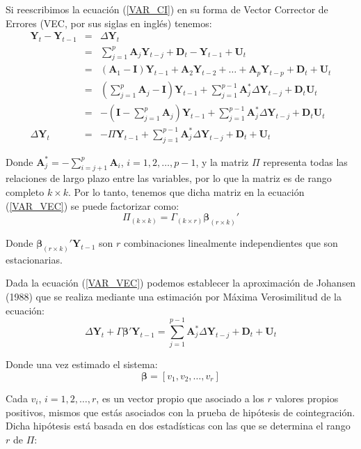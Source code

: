 \documentclass[
  a4paper,
]{article}
\begin{document}
Si reescribimos la ecuación (\ref{VAR_CI}) en su forma de Vector
Corrector de Errores (VEC, por sus siglas en inglés) tenemos:
\begin{eqnarray}
    \mathbf{Y}_t - \mathbf{Y}_{t-1} & = & \Delta \mathbf{Y}_t \nonumber \\
    & = & \sum_{j=1}^p \mathbf{A}_j \mathbf{Y}_{t-j} + \mathbf{D}_t - \mathbf{Y}_{t-1} + \mathbf{U}_t \nonumber \\
    & = & (\mathbf{A}_1 - \mathbf{I}) \mathbf{Y}_{t-1} + \mathbf{A}_2 \mathbf{Y}_{t-2} + \ldots + \mathbf{A}_p \mathbf{Y}_{t-p} + \mathbf{D}_t + \mathbf{U}_t \nonumber \\
    & = & \left( \sum_{j=1}^{p} \mathbf{A}_j - \mathbf{I} \right) \mathbf{Y}_{t-1} + \sum_{j=1}^{p-1} \mathbf{A}^*_j \Delta \mathbf{Y}_{t-j} + \mathbf{D}_t \mathbf{U}_t \nonumber \\
    & = & - \left( \mathbf{I} - \sum_{j=1}^{p} \mathbf{A}_j \right) \mathbf{Y}_{t-1} + \sum_{j=1}^{p-1} \mathbf{A}^*_j \Delta \mathbf{Y}_{t-j} + \mathbf{D}_t \mathbf{U}_t \nonumber \\
    \Delta \mathbf{Y}_t & = & - \Pi \mathbf{Y}_{t-1} + \sum_{j=1}^{p-1} \mathbf{A}^*_j \Delta \mathbf{Y}_{t-j} + \mathbf{D}_t + \mathbf{U}_t
    \label{VAR_VEC}
\end{eqnarray}

Donde \(\mathbf{A}_j^* = - \sum_{i=j+1}^p \mathbf{A}_i\),
\(i = 1, 2, \ldots, p-1\), y la matriz \(\Pi\) representa todas las
relaciones de largo plazo entre las variables, por lo que la matriz es
de rango completo \(k \times k\). Por lo tanto, tenemos que dicha matriz
en la ecuación (\ref{VAR_VEC}) se puede factorizar como: \[
    \Pi_{(k \times k)} = \Gamma_{(k \times r)} \boldsymbol{\beta}_{(r \times k)}'
    \label{Pi_Matrix}
\]

Donde \(\boldsymbol{\beta}_{(r \times k)}' \mathbf{Y}_{t-1}\) son \(r\)
combinaciones linealmente independientes que son estacionarias.

Dada la ecuación (\ref{VAR_VEC}) podemos establecer la aproximación de
Johansen (1988) que se realiza mediante una estimación por Máxima
Verosimilitud de la ecuación: \[
    \Delta \mathbf{Y}_t + \Gamma \boldsymbol{\beta}' \mathbf{Y}_{t-1} = \sum_{j=1}^{p-1} \mathbf{A}^*_j \Delta \mathbf{Y}_{t-j} + \mathbf{D}_t + \mathbf{U}_t
\]

Donde una vez estimado el sistema: \[
    \boldsymbol{\beta} = [v_1, v_2, \ldots, v_r]
\]

Cada \(v_i\), \(i = 1, 2, \ldots, r\), es un vector propio que asociado
a los \(r\) valores propios positivos, mismos que estás asociados con la
prueba de hipótesis de cointegración. Dicha hipótesis está basada en dos
estadísticas con las que se determina el rango \(r\) de \(\Pi\):
\end{document}
